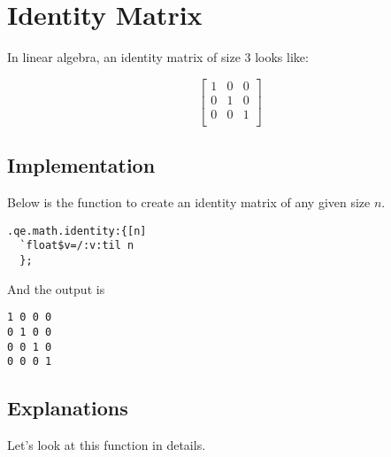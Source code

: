 \section{Identity Matrix}
\label{example:LinearInterpolcation}

In linear algebra, an identity matrix of size 3 looks like:

$$
\left[
\begin{matrix}
1 & 0 & 0\\
0 & 1 & 0\\
0 & 0 & 1\\
\end{matrix}
\right]
$$


\subsection{Implementation}
Below is the function to create an identity matrix of any given size $n$.

\begin{verbatim}
.qe.math.identity:{[n]
  `float$v=/:v:til n
  };
\end{verbatim}

And the output  is

\begin{verbatim}
1 0 0 0 
0 1 0 0 
0 0 1 0 
0 0 0 1 
\end{verbatim}


\subsection{Explanations}
Let's look at this function in details.


